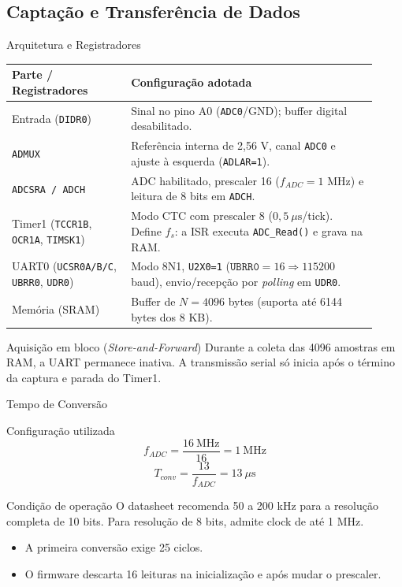 \documentclass{beamer}
\begin{document}
\subsection{Captação e Transferência de Dados}

\begin{frame}{Arquitetura e Registradores}
\footnotesize
\begin{tabular}{>{\raggedright\arraybackslash}p{0.30\linewidth}p{0.62\linewidth}}
\hline
\textbf{Parte / Registradores} & \textbf{Configuração adotada} \\\hline
Entrada (\texttt{DIDR0}) & Sinal no pino A0 (\texttt{ADC0}/GND); buffer digital desabilitado. \\[0.08cm]
\texttt{ADMUX} & Referência interna de 2,56 V, canal \texttt{ADC0} e ajuste à esquerda (\texttt{ADLAR=1}). \\[0.08cm]
\texttt{ADCSRA / ADCH} & ADC habilitado, prescaler 16 ($f_{ADC}=1\text{ MHz}$) e leitura de 8 bits em \texttt{ADCH}. \\[0.08cm]
Timer1 (\texttt{TCCR1B}, \texttt{OCR1A}, \texttt{TIMSK1}) & Modo CTC com prescaler 8 ($0{,}5\ \mu\text{s}$/tick). Define $f_s$: a ISR executa \texttt{ADC\_Read()} e grava na RAM. \\[0.08cm]
UART0 (\texttt{UCSR0A/B/C}, \texttt{UBRR0}, \texttt{UDR0}) & Modo 8N1, \texttt{U2X0=1} ($\texttt{UBRR0}=16 \Rightarrow 115200$ baud), envio/recepção por \textit{polling} em \texttt{UDR0}. \\[0.08cm]
Memória (SRAM) & Buffer de $N=4096$ bytes (suporta até 6144 bytes dos 8 KB). \\\hline
\end{tabular}
\begin{exampleblock}{Aquisição em bloco (\textit{Store-and-Forward})}
Durante a coleta das 4096 amostras em RAM, a UART permanece inativa. A transmissão serial só inicia após o término da captura e parada do Timer1.
\end{exampleblock}
\end{frame}

\begin{frame}{Tempo de Conversão}
\begin{block}{Configuração utilizada}
\[
f_{ADC}=\frac{16\ \text{MHz}}{16}=1\ \text{MHz}
\]
\[
T_{conv}=\frac{13}{f_{ADC}}=13\ \mu\text{s}
\]
\end{block}
\begin{alertblock}{Condição de operação}
O datasheet recomenda 50 a 200 kHz para a resolução completa de 10 bits. Para resolução de 8 bits, admite clock de até 1 MHz.
\end{alertblock}
\begin{itemize}
\item A primeira conversão exige 25 ciclos.
\item O firmware descarta 16 leituras na inicialização e após mudar o prescaler.
\end{itemize}
    
\end{frame}
\end{document}
